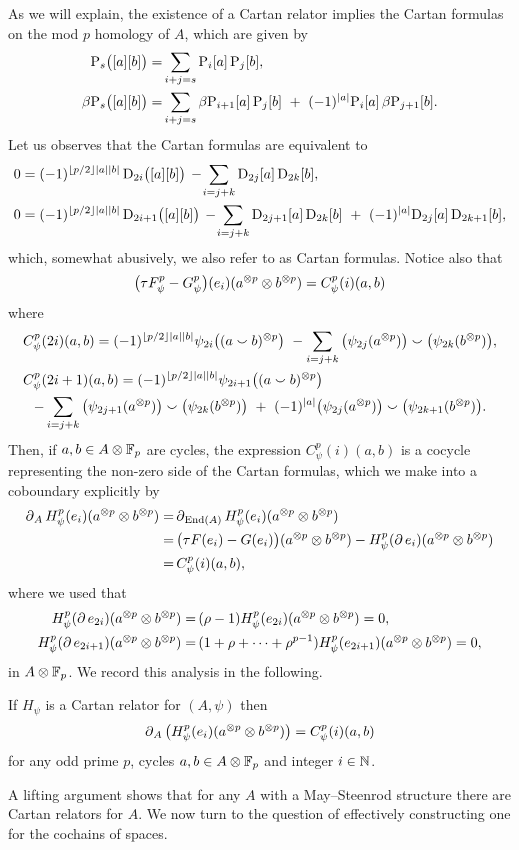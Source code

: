 As we will explain, the existence of a Cartan relator implies the Cartan formulas on the mod $p$ homology of $A$, which are given by
\begin{align*}
	\mathrm{P}_s\big([a][b]\big) =&
	\sum_{i+j=s} \mathrm{P}_i[a] \, \mathrm{P}_j[b], \\
	\beta\mathrm{P}_s\big([a][b]\big) =&
	\sum_{i+j=s} \beta\mathrm{P}_{i+1}[a] \, \mathrm{P}_j[b] \ +\ (-1)^{\lvert a\rvert} \mathrm{P}_i[a] \, \beta\mathrm{P}_{j+1}[b].
\end{align*}
Let us observes that the Cartan formulas are equivalent to
\begin{align*}
	0 &= (-1)^{\floor{p/2}\bars{a}\bars{b}} \, \rD_{2i}\big([a][b]\big) \,-\!
	\sum_{i=j+k} \rD_{2j}[a] \, \rD_{2k}[b], \\
	0 &= (-1)^{\floor{p/2}\bars{a}\bars{b}} \, \rD_{2i+1}\big([a][b]\big) \,-\!
	\sum_{i=j+k} \rD_{2j+1}[a] \, \rD_{2k}[b] \ +\ (-1)^{\bars{a}}\rD_{2j}[a] \, \rD_{2k+1}[b],
\end{align*}
which, somewhat abusively, we also refer to as Cartan formulas.
Notice also that
\[
\big(\tau F_\psi^p - G_\psi^p\big)(e_i)(a^{\otimes p} \otimes b^{\otimes p}) = C^p_\psi(i)(a,b)
\]
where
\begin{multline*}
	C_\psi^p(2i)(a,b) = (-1)^{\floor{p/2}\bars{a}\bars{b}} \psi_{2i}\big((a \smallsmile b)^{\ot p}\big) \ -
	\sum_{i=j+k}\big(\psi_{2j}(a^{\ot p})\big) \smallsmile \big(\psi_{2k}(b^{\ot p})\big), \hfill \\
	C_\psi^p(2i+1)(a,b) = (-1)^{\floor{p/2}\bars{a}\bars{b}} \psi_{2i+1}\big((a \smallsmile b)^{\ot p}\big) \hfill \\ -
	\sum_{i=j+k} \big(\psi_{2j+1}(a^{\ot p})\big) \smallsmile \big(\psi_{2k}(b^{\ot p})\big)\ +\
	(-1)^{\bars{a}}\big(\psi_{2j}(a^{\ot p})\big) \smallsmile \big(\psi_{2k+1}(b^{\ot p})\big).
\end{multline*}
Then, if $a,b \in A \otimes {\mathbb{F}_p}$ are cycles, the expression $C_\psi^p(i)(a,b)$ is a cocycle representing the non-zero side of the Cartan formulas, which we make into a coboundary explicitly by
\begin{align*}
	\operatorname{\partial}_A H_\psi^p(e_i)(a^{\otimes p} \otimes b^{\otimes p}) =&
	\operatorname{\partial}_{\mathrm{End}(A)} H_\psi^p(e_i)(a^{\otimes p} \otimes b^{\otimes p}) \\ =& \,
	\big(\tau F(e_i) - G(e_i)\big)(a^{\otimes p} \otimes b^{\otimes p}) -
	H_\psi^p(\operatorname{\partial} e_i)(a^{\otimes p} \otimes b^{\otimes p}) \\ =&\,
	C^p_\psi(i)(a,b),
\end{align*}
where we used that
\begin{align*}
	H_\psi^p(\operatorname{\partial} e_{2i})(a^{\otimes p} \otimes b^{\otimes p}) =&\,
	(\rho - 1) H_\psi^p(e_{2i})(a^{\otimes p} \otimes b^{\otimes p}) = 0, \\
	H_\psi^p(\operatorname{\partial} e_{2i+1})(a^{\otimes p} \otimes b^{\otimes p}) =&\,
	(1+\rho+\dots+\rho^{p-1}) H_\psi^p(e_{2i+1})(a^{\otimes p} \otimes b^{\otimes p}) = 0,
\end{align*}
in $A \otimes {\mathbb{F}_p}$.
We record this analysis in the following.
\begin{theorem}
	If $H_\psi$ is a Cartan relator for $(A, \psi)$ then
	\[
	\operatorname{\partial}_A \big(H_\psi^p(e_i)(a^{\otimes p} \otimes b^{\otimes p})\big) = C_\psi^p(i)(a, b)
	\]
	for any odd prime $p$, cycles $a,b \in A \otimes {\mathbb{F}_p}$ and integer $i \in \mathbb{N}$.
\end{theorem}

A lifting argument shows that for any $A$ with a May--Steenrod structure there are Cartan relators for $A$.
We now turn to the question of effectively constructing one for the cochains of spaces.